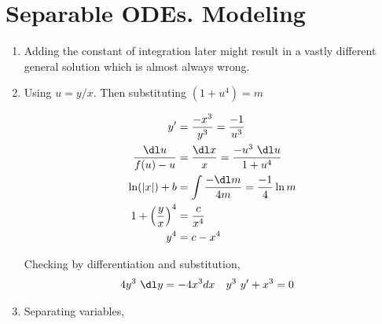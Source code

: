 \section{Separable ODEs. Modeling}

\begin{enumerate}
    \item Adding the constant of integration later might result in a vastly
          different general solution which is almost always wrong.

    \item Using $u = y/x$. Then substituting $(1 + u^{4}) = m$

          \begin{align}
              y'                     & = \frac{-x^{3}}{y^{3}} = \frac{-1}{u^{3}}     \\
              \frac{\dl u}{f(u) - u} & =  \frac{\dl x}{x} = \frac{-u^{3}\ \dl u}
              {1 + u^{4}}                                                            \\
              \ln (|x|) + b          & = \int \frac{-\dl m}{4m} = \frac{-1}{4} \ln m \\
              1 + \left(\frac{y}{x}\right)^{4}
                                     & = \frac{c}{x^{4}}                             \\
              y^{4}                  & = c - x^{4}
          \end{align}
          \begin{figure}[H]
              \centering
          \end{figure}
          Checking by differentiation and substitution,
          \begin{align}
              4y^{3}\ \dl y     & = -4x^{3} dx &
              y^{3}\ y' + x^{3} & = 0
          \end{align}


    \item Separating variables,


\end{enumerate}
